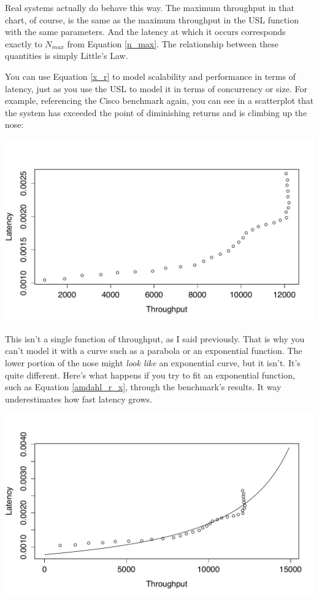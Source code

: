 \documentclass{vivid_layout}
\begin{document}
Real systems actually do behave this way. The maximum throughput in that chart,
of course, is the same as the maximum throughput in the USL function with the
same parameters. And the latency at which it occurs corresponds exactly to
$N_{max}$ from Equation \ref{n_max}. The relationship between these quantities
is simply Little's Law.

You can use Equation \ref{x_r} to model scalability and performance in terms of
latency, just as you use the USL to model it in terms of concurrency or size.
For example, referencing the Cisco benchmark again, you can see in a
scatterplot that the system has exceeded the point of diminishing returns and is
climbing up the nose:
\begin{center}
\includegraphics[width=.85\linewidth]{scalability/not-a-function}
\end{center}

This isn't a single function of throughput, as I said previously. That is why
you can't model it with a curve such as a parabola or an exponential function.
The lower portion of the nose might {\itshape look like} an exponential curve,
but it isn't. It's quite different.  Here's what happens if you try to fit an
exponential function, such as Equation \ref{amdahl_r_x},
through the benchmark's results. It way underestimates how fast latency grows.
\begin{center}
\includegraphics[width=.85\linewidth]{scalability/cisco-x-v-r-amdahl}
\end{center}
\end{document}
